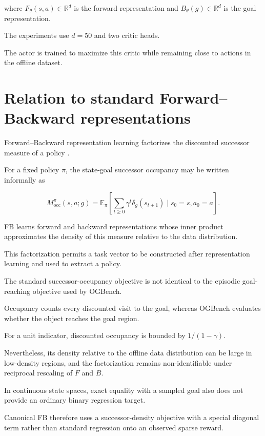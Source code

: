 \documentclass[11pt]{article}
\newcommand{\E}{\mathbb{E}}
\newcommand{\R}{\mathbb{R}}
\theoremstyle{remark}
\begin{document}
where $F_\theta(s,a)\in\R^d$ is the forward representation and $B_\theta(g)\in\R^d$ is the goal representation.

The experiments use $d=50$ and two critic heads.

The actor is trained to maximize this critic while remaining close to actions in the offline dataset.

\section{Relation to standard Forward--Backward representations}

Forward--Backward representation learning factorizes the discounted successor measure of a policy \citep{touati2021learning}.

For a fixed policy $\pi$, the state-goal successor occupancy may be written informally as

\begin{equation}
M_{\mathrm{occ}}^\pi(s,a;g)=\E_\pi\left[\sum_{t\geq 0}\gamma^t\delta_g(s_{t+1})\mid s_0=s,a_0=a\right].
\label{eq:occupancy}
\end{equation}

FB learns forward and backward representations whose inner product approximates the density of this measure relative to the data distribution.

This factorization permits a task vector to be constructed after representation learning and used to extract a policy.

The standard successor-occupancy objective is not identical to the episodic goal-reaching objective used by OGBench.

Occupancy counts every discounted visit to the goal, whereas OGBench evaluates whether the object reaches the goal region.

For a unit indicator, discounted occupancy is bounded by $1/(1-\gamma)$.

Nevertheless, its density relative to the offline data distribution can be large in low-density regions, and the factorization remains non-identifiable under reciprocal rescaling of $F$ and $B$.

In continuous state spaces, exact equality with a sampled goal also does not provide an ordinary binary regression target.

Canonical FB therefore uses a successor-density objective with a special diagonal term rather than standard regression onto an observed sparse reward.
\end{document}
